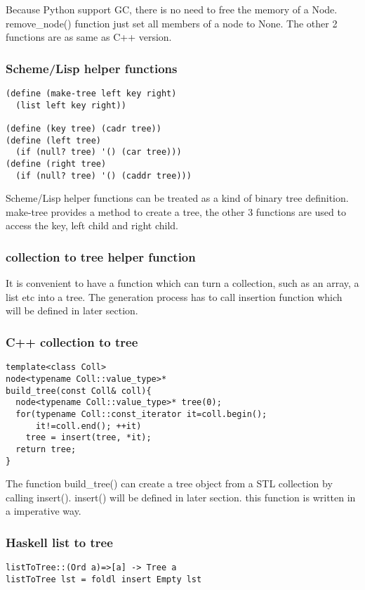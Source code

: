 \documentclass{article}
\begin{document}
Because Python support GC, there is no need to free the memory of a Node.
remove\_node() function just set all members of a node to None. The other
2 functions are as same as C++ version.

\subsubsection*{Scheme/Lisp helper functions}
\lstset{language=Lisp}
\begin{lstlisting}
(define (make-tree left key right)
  (list left key right))

(define (key tree) (cadr tree))
(define (left tree) 
  (if (null? tree) '() (car tree)))
(define (right tree) 
  (if (null? tree) '() (caddr tree)))
\end{lstlisting}

Scheme/Lisp helper functions can be treated as a kind of binary tree
definition. make-tree provides a method to create a tree, the other
3 functions are used to access the key, left child and right child.

\subsubsection{collection to tree helper function} \label{list2tree}
It is convenient to have a function which can turn a collection, such as
an array, a list etc into a tree. The generation process has to call insertion
function which will be defined in later section.

\subsubsection*{C++ collection to tree}
\lstset{language=C++}
\begin{lstlisting}
template<class Coll>
node<typename Coll::value_type>* 
build_tree(const Coll& coll){
  node<typename Coll::value_type>* tree(0);
  for(typename Coll::const_iterator it=coll.begin(); 
      it!=coll.end(); ++it)
    tree = insert(tree, *it);
  return tree;
}
\end{lstlisting}

The function build\_tree() can create a tree object from a STL collection 
by calling insert(). insert() will be defined in later section. this function
is written in a imperative way.

\subsubsection*{Haskell list to tree}
\lstset{language=Haskell}
\begin{lstlisting}
listToTree::(Ord a)=>[a] -> Tree a
listToTree lst = foldl insert Empty lst
\end{lstlisting}
\end{document}
